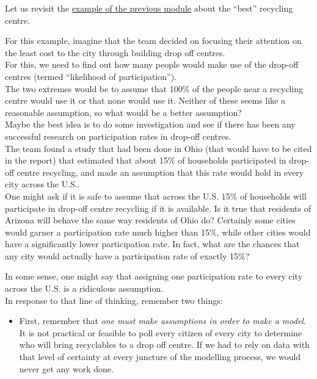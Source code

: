 \begin{example}

Let us revisit the \hyperref[ex-recycling]{example of the previous module} about the ``best'' recycling centre.

For this example, imagine that the team decided on focusing their attention on the least cost to the city through building drop off centres. \\

For this, we need to find out how many people would make use of the drop-off centres (termed ``likelihood of participation'').  \\

The two extremes would be to assume that 100\% of the people near a recycling centre would use it or that none would use it. Neither of these seems like a reasonable assumption, so what would be a better assumption?  \\

Maybe the best idea is to do some investigation and see if there has been any successful research on participation rates in drop-off centres.  \\

The team found a study that had been done in Ohio (that would have to be cited in the report) that estimated that about 15\% of households participated in drop-off centre recycling, and made an assumption that this rate would hold in every city across the U.S.. \\

One might ask if it is safe to assume that across the U.S. 15\% of households will participate in drop-off centre recycling if it is available. Is it true that residents of Arizona will behave the same way residents of Ohio do? Certainly some cities would garner a participation rate much higher than 15\%, while other cities would have a significantly lower participation rate. In fact, what are the chances that any city would actually have a participation rate of exactly 15\%?

In some sense, one might say that assigning one participation rate to every city across the U.S. is a ridiculous assumption. \\

In response to that line of thinking, remember two things:
\begin{itemize}
	\item First, remember that \emph{one must make assumptions in order to make a model}. It is not practical or feasible to poll every citizen of every city to determine who will bring recyclables to a drop off centre. If we had to rely on data with that level of certainty at every juncture of the modelling process, we would never get any work done.


\end{itemize}
\end{example}
